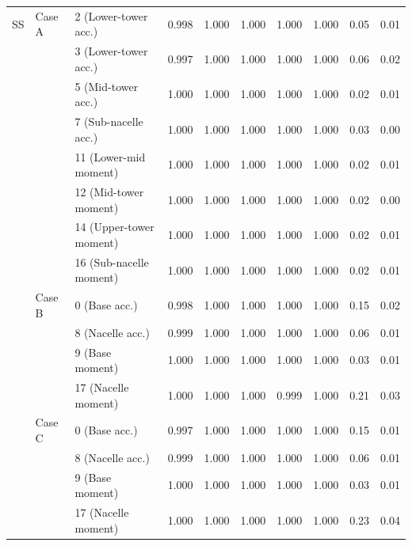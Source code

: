 \begin{table}[htbp]
{\begin{tabular}{lll ccccc cc}
\midrule
SS & Case A & 2 (Lower-tower acc.) & 0.998 & 1.000 & 1.000 & 1.000 & 1.000 & 0.05 & 0.01\\
 &  & 3 (Lower-tower acc.) & 0.997 & 1.000 & 1.000 & 1.000 & 1.000 & 0.06 & 0.02\\
 &  & 5 (Mid-tower acc.) & 1.000 & 1.000 & 1.000 & 1.000 & 1.000 & 0.02 & 0.01\\
 &  & 7 (Sub-nacelle acc.) & 1.000 & 1.000 & 1.000 & 1.000 & 1.000 & 0.03 & 0.00\\
 &  & 11 (Lower-mid moment) & 1.000 & 1.000 & 1.000 & 1.000 & 1.000 & 0.02 & 0.01\\
 &  & 12 (Mid-tower moment) & 1.000 & 1.000 & 1.000 & 1.000 & 1.000 & 0.02 & 0.00\\
 &  & 14 (Upper-tower moment) & 1.000 & 1.000 & 1.000 & 1.000 & 1.000 & 0.02 & 0.01\\
 &  & 16 (Sub-nacelle moment) & 1.000 & 1.000 & 1.000 & 1.000 & 1.000 & 0.02 & 0.01\\
 & Case B & 0 (Base acc.) & 0.998 & 1.000 & 1.000 & 1.000 & 1.000 & 0.15 & 0.02\\
 &  & 8 (Nacelle acc.) & 0.999 & 1.000 & 1.000 & 1.000 & 1.000 & 0.06 & 0.01\\
 &  & 9 (Base moment) & 1.000 & 1.000 & 1.000 & 1.000 & 1.000 & 0.03 & 0.01\\
 &  & 17 (Nacelle moment) & 1.000 & 1.000 & 1.000 & 0.999 & 1.000 & 0.21 & 0.03\\
 & Case C & 0 (Base acc.) & 0.997 & 1.000 & 1.000 & 1.000 & 1.000 & 0.15 & 0.01\\
 &  & 8 (Nacelle acc.) & 0.999 & 1.000 & 1.000 & 1.000 & 1.000 & 0.06 & 0.01\\
 &  & 9 (Base moment) & 1.000 & 1.000 & 1.000 & 1.000 & 1.000 & 0.03 & 0.01\\
 &  & 17 (Nacelle moment) & 1.000 & 1.000 & 1.000 & 1.000 & 1.000 & 0.23 & 0.04\\
\bottomrule
\end{tabular}}
\end{table}
